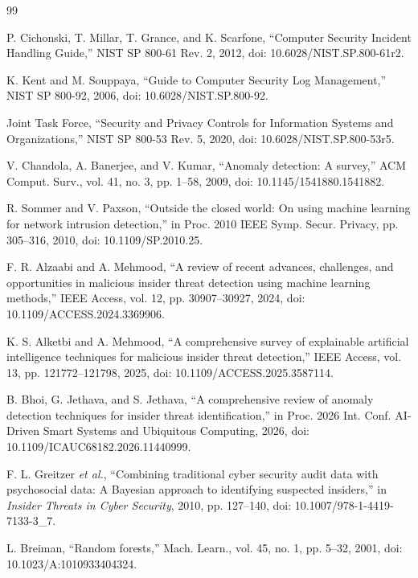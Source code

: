 \begin{thebibliography}{99}

P. Cichonski, T. Millar, T. Grance, and K. Scarfone, ``Computer Security Incident Handling Guide,'' NIST SP 800-61 Rev. 2, 2012, doi: 10.6028/NIST.SP.800-61r2.

K. Kent and M. Souppaya, ``Guide to Computer Security Log Management,'' NIST SP 800-92, 2006, doi: 10.6028/NIST.SP.800-92.

Joint Task Force, ``Security and Privacy Controls for Information Systems and Organizations,'' NIST SP 800-53 Rev. 5, 2020, doi: 10.6028/NIST.SP.800-53r5.

V. Chandola, A. Banerjee, and V. Kumar, ``Anomaly detection: A survey,'' ACM Comput. Surv., vol. 41, no. 3, pp. 1--58, 2009, doi: 10.1145/1541880.1541882.

R. Sommer and V. Paxson, ``Outside the closed world: On using machine learning for network intrusion detection,'' in Proc. 2010 IEEE Symp. Secur. Privacy, pp. 305--316, 2010, doi: 10.1109/SP.2010.25.

F. R. Alzaabi and A. Mehmood, ``A review of recent advances, challenges, and opportunities in malicious insider threat detection using machine learning methods,'' IEEE Access, vol. 12, pp. 30907--30927, 2024, doi: 10.1109/ACCESS.2024.3369906.

K. S. Alketbi and A. Mehmood, ``A comprehensive survey of explainable artificial intelligence techniques for malicious insider threat detection,'' IEEE Access, vol. 13, pp. 121772--121798, 2025, doi: 10.1109/ACCESS.2025.3587114.

B. Bhoi, G. Jethava, and S. Jethava, ``A comprehensive review of anomaly detection techniques for insider threat identification,'' in Proc. 2026 Int. Conf. AI-Driven Smart Systems and Ubiquitous Computing, 2026, doi: 10.1109/ICAUC68182.2026.11440999.

F. L. Greitzer \textit{et al.}, ``Combining traditional cyber security audit data with psychosocial data: A Bayesian approach to identifying suspected insiders,'' in \textit{Insider Threats in Cyber Security}, 2010, pp. 127--140, doi: 10.1007/978-1-4419-7133-3\_7.

L. Breiman, ``Random forests,'' Mach. Learn., vol. 45, no. 1, pp. 5--32, 2001, doi: 10.1023/A:1010933404324.


\end{thebibliography}

